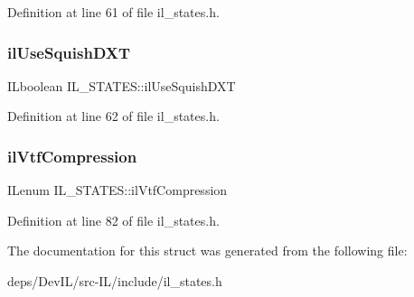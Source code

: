Definition at line 61 of file il\+\_\+states.\+h.

\mbox{\label{structIL__STATES_aee24c733d28c1241e0472cb174ff17b9}} 
\subsubsection{\texorpdfstring{il\+Use\+Squish\+D\+XT}{ilUseSquishDXT}}
{\footnotesize\ttfamily I\+Lboolean I\+L\+\_\+\+S\+T\+A\+T\+E\+S\+::il\+Use\+Squish\+D\+XT}



Definition at line 62 of file il\+\_\+states.\+h.

\mbox{\label{structIL__STATES_aad9f1dc7ac3b1ac4636e21c52951bf81}} 
\subsubsection{\texorpdfstring{il\+Vtf\+Compression}{ilVtfCompression}}
{\footnotesize\ttfamily I\+Lenum I\+L\+\_\+\+S\+T\+A\+T\+E\+S\+::il\+Vtf\+Compression}



Definition at line 82 of file il\+\_\+states.\+h.



The documentation for this struct was generated from the following file\+:\begin{DoxyCompactItemize}
\item 
deps/\+Dev\+I\+L/src-\/\+I\+L/include/il\+\_\+states.\+h\end{DoxyCompactItemize}

